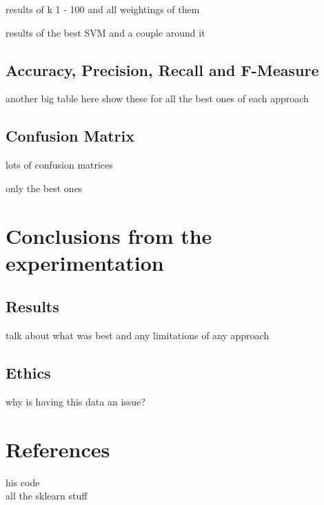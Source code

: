 \documentclass[paper=a4, fontsize=11pt]{scrartcl}
\numberwithin{equation}{section}		%
\numberwithin{figure}{section}			%
\numberwithin{table}{section}				%
\begin{document}
results of k 1 - 100 and all weightings of them

results of the best SVM and a couple around it

\subsection{Accuracy, Precision, Recall and F-Measure}

another big table here
show these for all the best ones of each approach

\subsection{Confusion Matrix}

lots of confusion matrices 

only the best ones

\section{Conclusions from the experimentation}

\subsection{Results}

talk about what was best and any limitations of any approach

\subsection{Ethics}

why is having this data an issue?

\section{References}

his code\\
all the sklearn stuff

\end{document}
